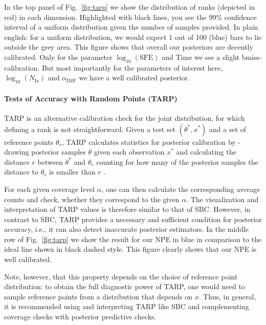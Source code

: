 \documentclass{aa}
\begin{document}
\begin{appendix}
In the top panel of Fig.~\ref{fig:tarp} we show the distribution of ranks (depicted in red) in each dimension. Highlighted with black lines, you see the 99\% confidence interval of a uniform distribution given the number of samples provided. In plain english: for a uniform distribution, we would expect 1 out of 100 (blue) bars to lie outside the grey area. This figure shows that overall our posteriors are decently calibrated. Only for the parameter $\log_{10}\left(\mathrm{SFE}\right)$ and Time we see a slight bmiss-calibration. But most importantly for the parameters of interest here, $\log_{10}\left(N_\mathrm{Ia}\right)$ and $\alpha_\mathrm{IMF}$ we have a well calibrated posterior.

\paragraph{Tests of Accuracy with Random Points (TARP)}

TARP \citep{Lemos2023} is an alternative calibration check for the joint distribution, for which defining a rank is not straightforward. Given a test set $(\theta^*,x^*)$ and a set of reference points $\theta_r$, TARP calculates statistics for posterior calibration by - drawing posterior samples $\theta$ given each observation $x^*$ and calculating the distance $r$ between $\theta^*$ and $\theta_r$ counting for how many of the posterior samples the distance to $\theta_r$ is smaller than $r$ \citep[see e.g. Fig.~2 in][for an illustration]{Lemos2023}.

For each given coverage level $\alpha$, one can then calculate the corresponding average counts and check, whether they correspond to the given $\alpha$. The visualization and interpretation of TARP values is therefore similar to that of SBC. However, in contrast to SBC, TARP provides a necessary and sufficient condition for posterior accuracy, i.e., it can also detect inaccurate posterior estimators. In the middle row of Fig.~\ref{fig:tarp} we show the result for our NPE in blue in comparison to the ideal line shown in black dashed style. This figure clearly shows that our NPE is well calibrated.

Note, however, that this property depends on the choice of reference point distribution: to obtain the full diagnostic power of TARP, one would need to sample reference points from a distribution that depends on $x$. Thus, in general, it is recommended using and interpreting TARP like SBC and complementing coverage checks with posterior predictive checks.


\end{appendix}
\end{document}
